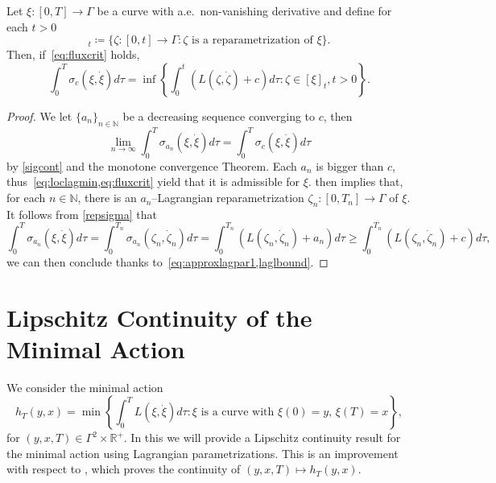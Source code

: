 \documentclass[11pt,a4paper,american]{article}
\newcommand{\Nds}{\mathds N}
\newcommand{\Rds}{\mathds R}
\begin{document}
    \begin{cor}\label{approxlagpar}
        Let $\xi:[0,T]\to\Gamma$ be a curve with a.e.\ non-vanishing derivative and define for each $t>0$
        \begin{equation*}
            [\xi]_t\coloneqq\{\zeta:[0,t]\to\Gamma:\text{$\zeta$ is a reparametrization of $\xi$}\}.
        \end{equation*}
        Then, if~\cref{eq:fluxcrit} holds,
        \begin{equation*}
            \int_0^T\sigma_c\left(\xi,\dot\xi\right)d\tau=\inf\left\{\int_0^t\left(L\left(\zeta,\dot\zeta\right)+c\right)d\tau:\zeta\in[\xi]_t,t>0\right\}.
        \end{equation*}
    \end{cor}
    \begin{proof}
        We let $\{a_n\}_{n\in\Nds}$ be a decreasing sequence converging to $c$, then
        \begin{equation}\label{eq:approxlagpar1}
            \lim_{n\to\infty}\int_0^T\sigma_{a_n}\left(\xi,\dot\xi\right)d\tau=\int_0^T\sigma_c\left(\xi,\dot\xi\right)d\tau
        \end{equation}
        by \cref{sigcont} and the monotone convergence Theorem. Each $a_n$ is bigger than $c$, thus~\cref{eq:loclagmin,eq:fluxcrit} yield that it is admissible for $\xi$.  then implies that, for each $n\in\Nds$, there is an $a_n$--Lagrangian reparametrization $\zeta_n:[0,T_n]\to\Gamma$ of $\xi$. It follows from \cref{repsigma} that
        \begin{equation*}
            \int_0^T\sigma_{a_n}\left(\xi,\dot\xi\right)d\tau=\!\int_0^{T_n}\sigma_{a_n}\left(\zeta_n,\dot\zeta_n\right)d\tau=\!\int_0^{T_n}\!\left(L\left(\zeta_n,\dot\zeta_n\right)+a_n\right)d\tau\ge\!\int_0^{T_n}\left(L\left(\zeta_n,\dot\zeta_n\right)+c\right)d\tau,
        \end{equation*}
        we can then conclude thanks to~\cref{eq:approxlagpar1,laglbound}.
    \end{proof}

    \section{Lipschitz Continuity of the Minimal Action}\label{minact}

    We consider the minimal action
    \begin{equation}\label{eq:minact}
        h_T(y,x)=\min\left\{\int_0^T L\left(\xi,\dot\xi\right)d\tau:\text{$\xi$ is a curve with $\xi(0)=y$, $\xi(T)=x$}\right\},
    \end{equation}
    for $(y,x,T)\in\Gamma^2\times\Rds^+$. In this  we will provide a Lipschitz continuity result for the minimal action using Lagrangian parametrizations. This is an improvement with respect to \cite[Theorem 5.4]{PozzaSiconolfi23}, which proves the continuity of $(y,x,T)\mapsto h_T(y,x)$.
\end{document}

